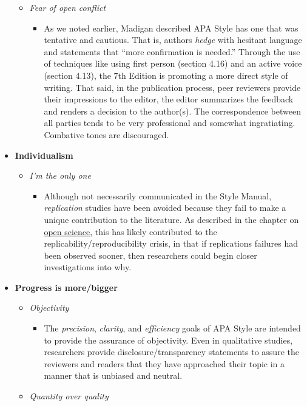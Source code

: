 \documentclass[
  11pt,
]{book}
\providecommand{\tightlist}{%
  \setlength{\itemsep}{0pt}\setlength{\parskip}{0pt}}
\begin{document}
\begin{itemize}
  \begin{itemize}
  \tightlist
  \item
    \emph{Fear of open conflict}

    \begin{itemize}
    \tightlist
    \item
      As we noted earlier, Madigan \citeyearpar{madigan_language_1995} described APA Style has one that was tentative and cautious. That is, authors \emph{hedge} with hesitant language and statements that ``more confirmation is needed.'' Through the use of techniques like using first person (section 4.16) and an active voice (section 4.13), the 7th Edition is promoting a more direct style of writing. That said, in the publication process, peer reviewers provide their impressions to the editor, the editor summarizes the feedback and renders a decision to the author(s). The correspondence between all parties tends to be very professional and somewhat ingratiating. Combative tones are discouraged.
    \end{itemize}
  \end{itemize}
\item
  \textbf{Individualism}

  \begin{itemize}
  \tightlist
  \item
    \emph{I'm the only one}

    \begin{itemize}
    \tightlist
    \item
      Although not necessarily communicated in the Style Manual, \emph{replication} studies have been avoided because they fail to make a unique contribution to the literature. As described in the chapter on \hyperref[OpSci]{open science}, this has likely contributed to the replicability/reproducibility crisis, in that if replications failures had been observed sooner, then researchers could begin closer investigations into why.
    \end{itemize}
  \end{itemize}
\item
  \textbf{Progress is more/bigger}

  \begin{itemize}
  \tightlist
  \item
    \emph{Objectivity}

    \begin{itemize}
    \tightlist
    \item
      The \emph{precision}, \emph{clarity}, and \emph{efficiency} goals of APA Style are intended to provide the assurance of objectivity. Even in qualitative studies, researchers provide disclosure/transparency statements to assure the reviewers and readers that they have approached their topic in a manner that is unbiased and neutral.
    \end{itemize}
  \item
    \emph{Quantity over quality}


\end{itemize}
\end{itemize}
\end{document}
